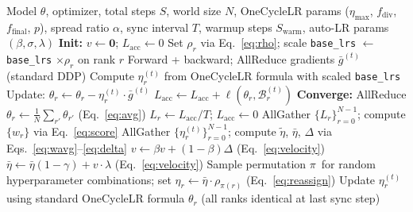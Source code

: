 \documentclass{article}
\begin{document}
\begin{algorithm}[t]
\caption{Hyperparameter-Divergent Ensemble Training (HDET)}
\label{alg:hdet}
\begin{algorithmic}[1]
\Require Model $\theta$, optimizer, total steps $S$, world size $N$,
         OneCycleLR params ($\eta_{\max}$, $f_{\mathrm{div}}$, $f_{\mathrm{final}}$, $p$),
         spread ratio $\alpha$, sync interval $T$,
         warmup steps $S_{\mathrm{warm}}$, auto-LR params $(\beta, \sigma, \lambda)$
\State \textbf{Init:} $v \leftarrow \mathbf{0}$;\; $L_{\mathrm{acc}} \leftarrow 0$
\State Set $\rho_r$ via Eq.~\eqref{eq:rho};\;
       scale \texttt{base\_lrs} $\leftarrow$ \texttt{base\_lrs} $\times \rho_r$ on rank $r$
  \State Forward + backward; AllReduce gradients $\bar{g}^{(t)}$ (standard DDP)
  \State Compute $\eta_r^{(t)}$ from OneCycleLR formula with scaled \texttt{base\_lrs}
  \State Update: $\theta_r \leftarrow \theta_r - \eta_r^{(t)} \cdot \bar{g}^{(t)}$
  \State $L_{\mathrm{acc}} \leftarrow L_{\mathrm{acc}} + \ell(\theta_r, \mathcal{B}_r^{(t)})$
    \State \textbf{Converge:} AllReduce $\theta_r \leftarrow \frac{1}{N}\sum_{r'}\theta_{r'}$
          \hfill (Eq.~\ref{eq:avg})
      \State $L_r \leftarrow L_{\mathrm{acc}}/T$;\; $L_{\mathrm{acc}} \leftarrow 0$
      \State AllGather $\{L_r\}_{r=0}^{N-1}$;\; compute $\{w_r\}$ via
             Eq.~\eqref{eq:score}
      \State AllGather $\{\eta_r^{(t)}\}_{r=0}^{N-1}$;\; compute
             $\tilde\eta$, $\bar\eta$, $\Delta$ via Eqs.~\eqref{eq:wavg}--\eqref{eq:delta}
      \State $v \leftarrow \beta v + (1-\beta)\Delta$
             \hfill (Eq.~\ref{eq:velocity})
      \State $\bar\eta \leftarrow \bar\eta(1-\gamma) + v \cdot \lambda$
             \hfill (Eq.~\ref{eq:velocity})
      \State Sample permutation $\pi$\ for random hyperparameter combinations; set
             $\eta_r \leftarrow \bar\eta \cdot \rho_{\pi(r)}$
             \hfill (Eq.~\ref{eq:reassign})
    \Else
      \State Update $\eta_r^{(t)}$ using standard OneCycleLR formula
    \EndIf
  \EndIf
\EndFor
\State \Return $\theta_r$ (all ranks identical at last sync step)
\end{algorithmic}
\end{algorithm}
\end{document}
